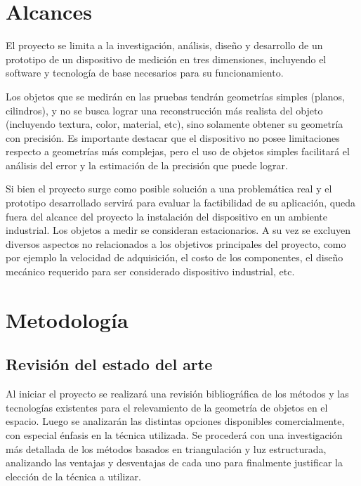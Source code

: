 \section{Alcances}
El proyecto se limita a la investigación, análisis, diseño y desarrollo de un prototipo de un dispositivo de medición en tres dimensiones, incluyendo el software y tecnología de base necesarios para su funcionamiento.

Los objetos que se medirán en las pruebas tendrán geometrías simples (planos, cilindros), y no se busca lograr una reconstrucción más realista del objeto (incluyendo textura, color, material, etc), sino solamente obtener su geometría con precisión. Es importante destacar que el dispositivo no posee limitaciones respecto a geometrías más complejas, pero el uso de objetos simples facilitará el análisis del error y la estimación de la precisión que puede lograr.

Si bien el proyecto surge como posible solución a una problemática real y el prototipo desarrollado servirá para evaluar la factibilidad de su aplicación, queda fuera del alcance del proyecto la instalación del dispositivo en un ambiente industrial. Los objetos a medir se consideran estacionarios. A su vez se excluyen diversos aspectos no relacionados a los objetivos principales del proyecto, como por ejemplo la velocidad de adquisición, el costo de los componentes, el diseño mecánico requerido para ser considerado dispositivo industrial, etc.

\section{Metodología}
\subsection{Revisión del estado del arte}
Al iniciar el proyecto se realizará una revisión bibliográfica de los métodos y las tecnologías existentes para el relevamiento de la geometría de objetos en el espacio. Luego se analizarán las distintas opciones disponibles comercialmente, con especial énfasis en la técnica utilizada. Se procederá con una investigación más detallada de los métodos basados en triangulación y luz estructurada, analizando las ventajas y desventajas de cada uno para finalmente justificar la elección de la técnica a utilizar.

